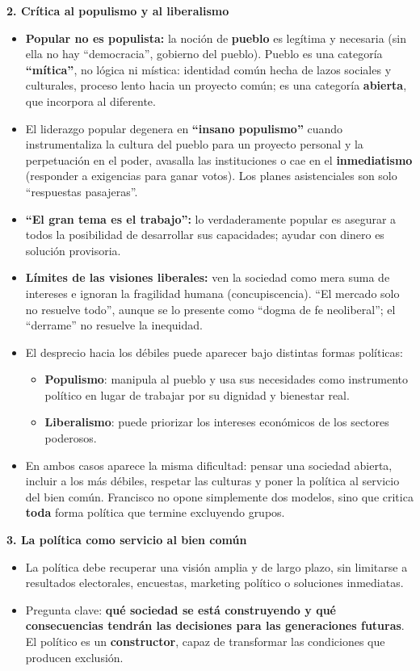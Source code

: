 \documentclass[10pt,a4paper]{article}
\begin{document}
\medskip\noindent \textbf{2. Crítica al populismo y al liberalismo}\par\nopagebreak
\begin{itemize}
\item \textbf{Popular no es populista:} la noción de \textbf{pueblo} es legítima y necesaria (sin ella no hay ``democracia'', gobierno del pueblo). Pueblo es una categoría \textbf{``mítica''}, no lógica ni mística: identidad común hecha de lazos sociales y culturales, proceso lento hacia un proyecto común; es una categoría \textbf{abierta}, que incorpora al diferente.
\item El liderazgo popular degenera en \textbf{``insano populismo''} cuando instrumentaliza la cultura del pueblo para un proyecto personal y la perpetuación en el poder, avasalla las instituciones o cae en el \textbf{inmediatismo} (responder a exigencias para ganar votos). Los planes asistenciales son solo ``respuestas pasajeras''.
\item \textbf{``El gran tema es el trabajo'':} lo verdaderamente popular es asegurar a todos la posibilidad de desarrollar sus capacidades; ayudar con dinero es solución provisoria.
\item \textbf{Límites de las visiones liberales:} ven la sociedad como mera suma de intereses e ignoran la fragilidad humana (concupiscencia). ``El mercado solo no resuelve todo'', aunque se lo presente como ``dogma de fe neoliberal''; el ``derrame'' no resuelve la inequidad.
\item El desprecio hacia los débiles puede aparecer bajo distintas formas políticas:
\begin{itemize}
\item \textbf{Populismo}: manipula al pueblo y usa sus necesidades como instrumento político en lugar de trabajar por su dignidad y bienestar real.
\item \textbf{Liberalismo}: puede priorizar los intereses económicos de los sectores poderosos.
\end{itemize}
\item En ambos casos aparece la misma dificultad: pensar una sociedad abierta, incluir a los más débiles, respetar las culturas y poner la política al servicio del bien común. Francisco no opone simplemente dos modelos, sino que critica \textbf{toda} forma política que termine excluyendo grupos.
\end{itemize}

\medskip\noindent \textbf{3. La política como servicio al bien común}\par\nopagebreak
\begin{itemize}
\item La política debe recuperar una visión amplia y de largo plazo, sin limitarse a resultados electorales, encuestas, marketing político o soluciones inmediatas.
\item Pregunta clave: \textbf{qué sociedad se está construyendo y qué consecuencias tendrán las decisiones para las generaciones futuras}. El político es un \textbf{constructor}, capaz de transformar las condiciones que producen exclusión.
\end{itemize}
\end{document}
